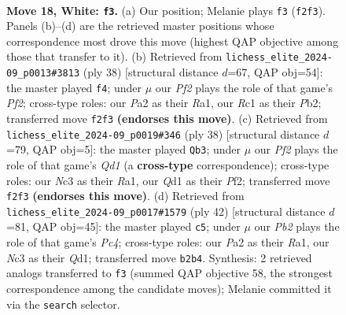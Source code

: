 \documentclass[11pt]{article}
\begin{document}
\begin{figure}[p]
\label{fig:thought-m32}
\end{figure}

\clearpage

\begin{figure}[p]\centering
\begin{subfigure}{0.46\textwidth}\centering
\resizebox{\linewidth}{!}{%
\newchessgame
\chessboard[
  setfen={r1b2rk1/pp1n3p/2pq2p1/3p2p1/3P4/2NBP1P1/PP3P1P/2RQR1K1 w - - 1 18},
  showmover=false,
  pgfstyle=straightmove, color=movearrow, markmove={f2-f3}
]}
\caption{}
\end{subfigure}\hfill
\begin{subfigure}{0.46\textwidth}\centering
\resizebox{\linewidth}{!}{%
\newchessgame
\chessboard[
  setfen={5r1k/pb4pp/1pnqpr2/2p5/2Pp3P/1N1P2P1/PP2QPB1/R3R1K1 w - - 4 20},
  showmover=false,
  pgfstyle=straightmove, color=movearrow, markmove={f2-f4}
]}
\caption{}
\end{subfigure}
\\[4pt]
\begin{subfigure}{0.46\textwidth}\centering
\resizebox{\linewidth}{!}{%
\newchessgame
\chessboard[
  setfen={r2r2k1/1pq1b1np/2p1p1pB/p1P1p3/1P2P3/P5NP/5PP1/R2Q1RK1 w - - 1 20},
  showmover=false,
  pgfstyle=straightmove, color=movearrow, markmove={d1-b3}
]}
\caption{}
\end{subfigure}\hfill
\begin{subfigure}{0.46\textwidth}\centering
\resizebox{\linewidth}{!}{%
\newchessgame
\chessboard[
  setfen={r3r1k1/ppqb1ppn/2p1p2p/4P3/1PP5/P1N3P1/5PBP/R2QR1K1 w - - 1 22},
  showmover=false,
  pgfstyle=straightmove, color=movearrow, markmove={c4-c5}
]}
\caption{}
\end{subfigure}
\caption{\textbf{Move 18, White: \texttt{f3}.} (a) Our position; Melanie plays \texttt{f3} (\texttt{f2f3}). Panels (b)--(d) are the retrieved master positions whose correspondence most drove this move (highest QAP objective among those that transfer to it). (b) Retrieved from \texttt{lichess\_elite\_2024-09\_p0013\#3813} (ply 38) [structural distance $d$=67, QAP obj=54]: the master played \texttt{f4}; under $\mu$ our \emph{Pf2} plays the role of that game's \emph{Pf2}; cross-type roles: our \emph{P}a2 as their \emph{R}a1, our \emph{R}c1 as their \emph{P}b2; transferred move \texttt{f2f3} \textbf{(endorses this move)}. (c) Retrieved from \texttt{lichess\_elite\_2024-09\_p0019\#346} (ply 38) [structural distance $d$=79, QAP obj=5]: the master played \texttt{Qb3}; under $\mu$ our \emph{Pf2} plays the role of that game's \emph{Qd1} (a \textbf{cross-type} correspondence); cross-type roles: our \emph{N}c3 as their \emph{R}a1, our \emph{Q}d1 as their \emph{P}f2; transferred move \texttt{f2f3} \textbf{(endorses this move)}. (d) Retrieved from \texttt{lichess\_elite\_2024-09\_p0017\#1579} (ply 42) [structural distance $d$=81, QAP obj=45]: the master played \texttt{c5}; under $\mu$ our \emph{Pb2} plays the role of that game's \emph{Pc4}; cross-type roles: our \emph{P}a2 as their \emph{R}a1, our \emph{N}c3 as their \emph{Q}d1; transferred move \texttt{b2b4}. Synthesis: 2 retrieved analogs transferred to \texttt{f3} (summed QAP objective 58, the strongest correspondence among the candidate moves); Melanie committed it via the \texttt{search} selector.}

\end{figure}
\end{document}
